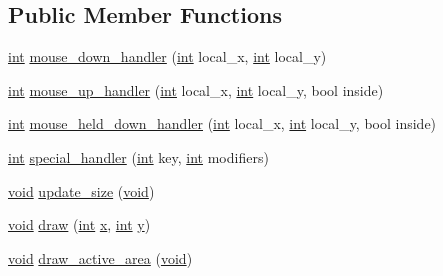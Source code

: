 \subsection*{Public Member Functions}
\begin{DoxyCompactItemize}
\item 
\hyperlink{wglext_8h_a500a82aecba06f4550f6849b8099ca21}{int} \hyperlink{class_g_l_u_i___mouse___interaction_ae21d31df518cdd5c6542d8cc88681a57}{mouse\+\_\+down\+\_\+handler} (\hyperlink{wglext_8h_a500a82aecba06f4550f6849b8099ca21}{int} local\+\_\+x, \hyperlink{wglext_8h_a500a82aecba06f4550f6849b8099ca21}{int} local\+\_\+y)
\item 
\hyperlink{wglext_8h_a500a82aecba06f4550f6849b8099ca21}{int} \hyperlink{class_g_l_u_i___mouse___interaction_a03d3c78048418b27f8bbe258f6f455e2}{mouse\+\_\+up\+\_\+handler} (\hyperlink{wglext_8h_a500a82aecba06f4550f6849b8099ca21}{int} local\+\_\+x, \hyperlink{wglext_8h_a500a82aecba06f4550f6849b8099ca21}{int} local\+\_\+y, bool inside)
\item 
\hyperlink{wglext_8h_a500a82aecba06f4550f6849b8099ca21}{int} \hyperlink{class_g_l_u_i___mouse___interaction_a91bf2ba2ff20dab94ef634e38fbfaa84}{mouse\+\_\+held\+\_\+down\+\_\+handler} (\hyperlink{wglext_8h_a500a82aecba06f4550f6849b8099ca21}{int} local\+\_\+x, \hyperlink{wglext_8h_a500a82aecba06f4550f6849b8099ca21}{int} local\+\_\+y, bool inside)
\item 
\hyperlink{wglext_8h_a500a82aecba06f4550f6849b8099ca21}{int} \hyperlink{class_g_l_u_i___mouse___interaction_aadcfba66761f87037341c7031e225746}{special\+\_\+handler} (\hyperlink{wglext_8h_a500a82aecba06f4550f6849b8099ca21}{int} key, \hyperlink{wglext_8h_a500a82aecba06f4550f6849b8099ca21}{int} modifiers)
\item 
\hyperlink{wglext_8h_a9e6b7f1933461ef318bb000d6bd13b83}{void} \hyperlink{class_g_l_u_i___mouse___interaction_a29237239a861d24ab52b971b0d2fead2}{update\+\_\+size} (\hyperlink{wglext_8h_a9e6b7f1933461ef318bb000d6bd13b83}{void})
\item 
\hyperlink{wglext_8h_a9e6b7f1933461ef318bb000d6bd13b83}{void} \hyperlink{class_g_l_u_i___mouse___interaction_ab51243d0750f3cc8f950e046c4bffd13}{draw} (\hyperlink{wglext_8h_a500a82aecba06f4550f6849b8099ca21}{int} \hyperlink{glext_8h_ad77deca22f617d3f0e0eb786445689fc}{x}, \hyperlink{wglext_8h_a500a82aecba06f4550f6849b8099ca21}{int} \hyperlink{glext_8h_a9298c7ad619074f5285b32c6b72bfdea}{y})
\item 
\hyperlink{wglext_8h_a9e6b7f1933461ef318bb000d6bd13b83}{void} \hyperlink{class_g_l_u_i___mouse___interaction_aacb2dd881015d1f7e8eeced3796e3a6d}{draw\+\_\+active\+\_\+area} (\hyperlink{wglext_8h_a9e6b7f1933461ef318bb000d6bd13b83}{void})

\end{DoxyCompactItemize}
